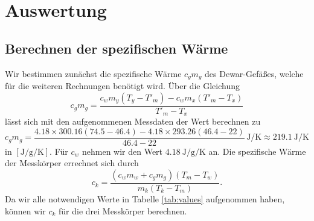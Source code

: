 \section{Auswertung}
\label{sec:Auswertung}
\subsection{Berechnen der spezifischen Wärme}
Wir bestimmen zunächst die spezifische Wärme $c_gm_g$ des Dewar-Gefäßes, welche für die weiteren Rechnungen benötigt wird.
Über die Gleichung
\begin{equation}
    c_gm_g = \frac{c_wm_y(T_y-T'_m)-c_wm_x(T'_m-T_x)}{T'_m-T_x}
\end{equation}
lässt sich mit den aufgenommenen Messdaten der Wert berechnen zu
\begin{equation} %
    c_gm_g = \frac{4.18\times300.16(74.5-46.4)-4.18\times293.26(46.4-22)}{46.4-22} \, \si{\joule\per\kelvin} \approx \SI{219.1}{\joule\per\kelvin} 
\end{equation}
in $[\si{\joule\per\gram\per\kelvin}]$.
Für $c_w$ nehmen wir den Wert $\SI{4.18}{\joule\per\g\per\kelvin}$ an.\cite{Versuchsanleitung}
Die spezifische Wärme der Messkörper errechnet sich durch
\begin{equation}
    c_k = \frac{(c_wm_w + c_gm_g)(T_m - T_w)}{m_k(T_k - T_m)}.
\end{equation}
Da wir alle notwendigen Werte in Tabelle \ref{tab:values} aufgenommen haben, können wir $c_k$ für die drei Messkörper berechnen.
